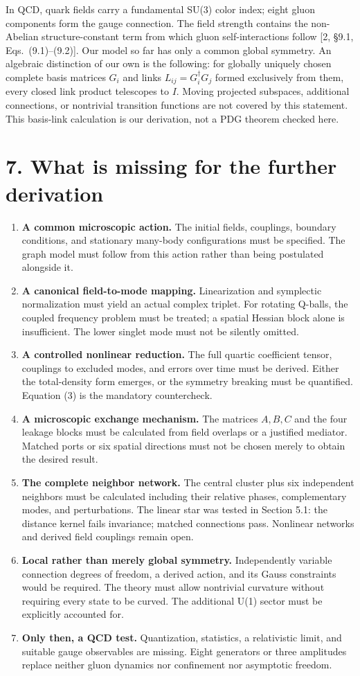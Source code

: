 \documentclass[a4paper,11pt]{article}
\begin{document}
In QCD, quark fields carry a fundamental SU(3) color index; eight gluon components form the gauge connection. The field strength contains the non-Abelian structure-constant term from which gluon self-interactions follow [2, \S9.1, Eqs.~(9.1)--(9.2)]. Our model so far has only a common global symmetry. An algebraic distinction of our own is the following: for globally uniquely chosen complete basis matrices $G_i$ and links $L_{ij}=G_i^\dagger G_j$ formed exclusively from them, every closed link product telescopes to $I$. Moving projected subspaces, additional connections, or nontrivial transition functions are not covered by this statement. This basis-link calculation is our derivation, not a PDG theorem checked here.

\section*{7. What is missing for the further derivation}
\begin{enumerate}
\item \textbf{A common microscopic action.} The initial fields, couplings, boundary conditions, and stationary many-body configurations must be specified. The graph model must follow from this action rather than being postulated alongside it.
\item \textbf{A canonical field-to-mode mapping.} Linearization and symplectic normalization must yield an actual complex triplet. For rotating Q-balls, the coupled frequency problem must be treated; a spatial Hessian block alone is insufficient. The lower singlet mode must not be silently omitted.
\item \textbf{A controlled nonlinear reduction.} The full quartic coefficient tensor, couplings to excluded modes, and errors over time must be derived. Either the total-density form emerges, or the symmetry breaking must be quantified. Equation (3) is the mandatory countercheck.
\item \textbf{A microscopic exchange mechanism.} The matrices $A,B,C$ and the four leakage blocks must be calculated from field overlaps or a justified mediator. Matched ports or six spatial directions must not be chosen merely to obtain the desired result.
\item \textbf{The complete neighbor network.} The central cluster plus six independent neighbors must be calculated including their relative phases, complementary modes, and perturbations. The linear star was tested in Section 5.1: the distance kernel fails invariance; matched connections pass. Nonlinear networks and derived field couplings remain open.
\item \textbf{Local rather than merely global symmetry.} Independently variable connection degrees of freedom, a derived action, and its Gauss constraints would be required. The theory must allow nontrivial curvature without requiring every state to be curved. The additional U(1) sector must be explicitly accounted for.
\item \textbf{Only then, a QCD test.} Quantization, statistics, a relativistic limit, and suitable gauge observables are missing. Eight generators or three amplitudes replace neither gluon dynamics nor confinement nor asymptotic freedom.
\end{enumerate}
\end{document}
